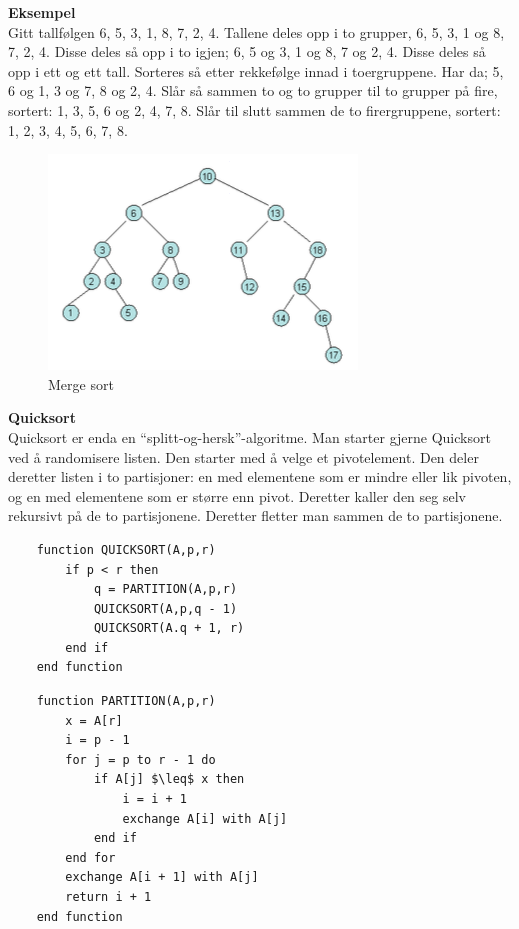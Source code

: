 \noindent \textbf{Eksempel}\\
Gitt tallfølgen 6, 5, 3, 1, 8, 7, 2, 4. Tallene deles opp i to grupper, 6, 5, 3, 1 og 8, 7, 2, 4. Disse deles så opp i to igjen; 6, 5 og 3, 1 og 8, 7 og 2, 4. Disse deles så opp i ett og ett tall. Sorteres så etter rekkefølge innad i toergruppene. Har da; 5, 6 og 1, 3 og 7, 8 og 2, 4. Slår så sammen to og to grupper til to grupper på fire, sortert: 1, 3, 5, 6 og 2, 4, 7, 8. Slår til slutt sammen de to firergruppene, sortert: 1, 2, 3, 4, 5, 6, 7, 8.

\begin{figure}[H]
\includegraphics[scale=0.7]{images/mergesort}
\centering %
\caption{Merge sort}
\label{fig:mergesort}
\end{figure}

\noindent \textbf{Quicksort}\\
Quicksort er enda en “splitt-og-hersk”-algoritme. Man starter gjerne Quicksort ved å randomisere listen. Den starter med å velge et pivotelement. Den deler deretter listen i to partisjoner: en med elementene som er mindre eller lik pivoten, og en med elementene som er større enn pivot. Deretter kaller den seg selv rekursivt på de to partisjonene. Deretter fletter man sammen de to partisjonene.

\begin{lstlisting}
    function QUICKSORT(A,p,r)
    	if p < r then
    		q = PARTITION(A,p,r)
    		QUICKSORT(A,p,q - 1)
    		QUICKSORT(A.q + 1, r)
    	end if
    end function
\end{lstlisting}

\begin{lstlisting}
    function PARTITION(A,p,r)
	    x = A[r]
    	i = p - 1
    	for j = p to r - 1 do
    		if A[j] $\leq$ x then
    			i = i + 1
    			exchange A[i] with A[j]
    		end if
    	end for
    	exchange A[i + 1] with A[j]
    	return i + 1
    end function
\end{lstlisting}

